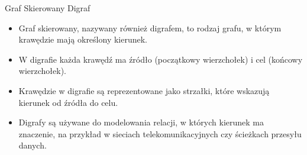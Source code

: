 \documentclass[polish,envcountsect,10pt]{beamer}
\begin{document}
\begin{frame}{Graf Skierowany Digraf}

\begin{itemize}
  \item Graf skierowany, nazywany również digrafem, to rodzaj grafu, w którym krawędzie mają określony kierunek.
  \item W digrafie każda krawędź ma źródło (początkowy wierzchołek) i cel (końcowy wierzchołek).
  \item Krawędzie w digrafie są reprezentowane jako strzałki, które wskazują kierunek od źródła do celu.
  \item Digrafy są używane do modelowania relacji, w których kierunek ma znaczenie, na przykład w sieciach telekomunikacyjnych czy ścieżkach przesyłu danych.
\end{itemize}

\begin{center}
\end{center}
\end{frame}
\end{document}
